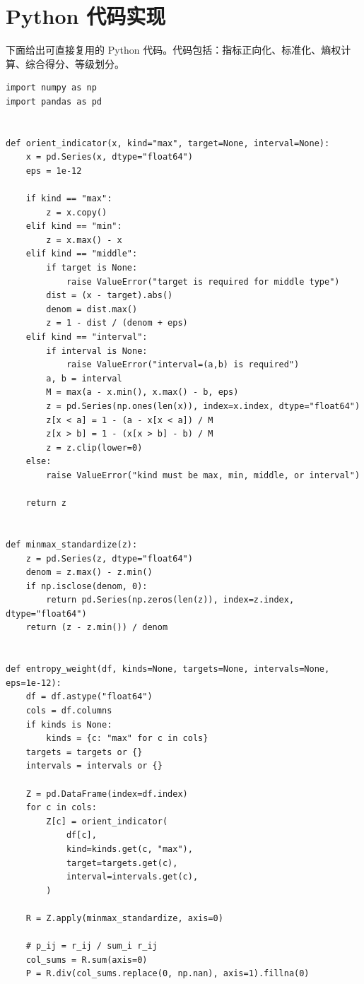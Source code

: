 \documentclass[UTF8,zihao=-4]{ctexart}
\begin{document}
\section{Python 代码实现}

下面给出可直接复用的 Python 代码。代码包括：指标正向化、标准化、熵权计算、综合得分、等级划分。

\begin{lstlisting}[style=pythonstyle,caption={Entropy Weight Method in Python}]
import numpy as np
import pandas as pd


def orient_indicator(x, kind="max", target=None, interval=None):
    x = pd.Series(x, dtype="float64")
    eps = 1e-12

    if kind == "max":
        z = x.copy()
    elif kind == "min":
        z = x.max() - x
    elif kind == "middle":
        if target is None:
            raise ValueError("target is required for middle type")
        dist = (x - target).abs()
        denom = dist.max()
        z = 1 - dist / (denom + eps)
    elif kind == "interval":
        if interval is None:
            raise ValueError("interval=(a,b) is required")
        a, b = interval
        M = max(a - x.min(), x.max() - b, eps)
        z = pd.Series(np.ones(len(x)), index=x.index, dtype="float64")
        z[x < a] = 1 - (a - x[x < a]) / M
        z[x > b] = 1 - (x[x > b] - b) / M
        z = z.clip(lower=0)
    else:
        raise ValueError("kind must be max, min, middle, or interval")

    return z


def minmax_standardize(z):
    z = pd.Series(z, dtype="float64")
    denom = z.max() - z.min()
    if np.isclose(denom, 0):
        return pd.Series(np.zeros(len(z)), index=z.index, dtype="float64")
    return (z - z.min()) / denom


def entropy_weight(df, kinds=None, targets=None, intervals=None, eps=1e-12):
    df = df.astype("float64")
    cols = df.columns
    if kinds is None:
        kinds = {c: "max" for c in cols}
    targets = targets or {}
    intervals = intervals or {}

    Z = pd.DataFrame(index=df.index)
    for c in cols:
        Z[c] = orient_indicator(
            df[c],
            kind=kinds.get(c, "max"),
            target=targets.get(c),
            interval=intervals.get(c),
        )

    R = Z.apply(minmax_standardize, axis=0)

    # p_ij = r_ij / sum_i r_ij
    col_sums = R.sum(axis=0)
    P = R.div(col_sums.replace(0, np.nan), axis=1).fillna(0)


\end{lstlisting}
\end{document}
